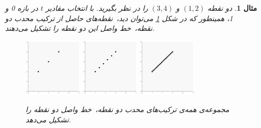 \documentclass[12pt]{book}
\newtheorem{ex}[thm]{\textbf{مثال}}
\begin{document}
	\begin{ex}
		دو نقطه \( (1, 2) \) و \( (3 ,4) \) را در نظر بگیرید.
		با انتخاب  مقادیر
		\( t \)
		در بازه 0 و 1، همینطور که در شکل \ref{convex_ex_1} می‌توان دید،‌\ نقطه‌های حاصل از ترکیب محدب دو نقطه،\ خط واصل این دو نقطه را تشکیل می‌دهند.
		\begin{figure}[h]
			\centering
			\includegraphics[width=0.25\textwidth]{convex_line_1}
			\includegraphics[width=0.25\textwidth]{convex_line_2}
			\includegraphics[width=0.25\textwidth]{convex_line_3}
			\caption{‌مجموعه‌ی همه‌ی ترکیب‌های محدب دو نقطه،\ خط واصل دو نقطه را تشکیل می‌دهد. }
			\label{convex_ex_1}
		\end{figure}
	\end{ex}
	\pagebreak
\end{document}
